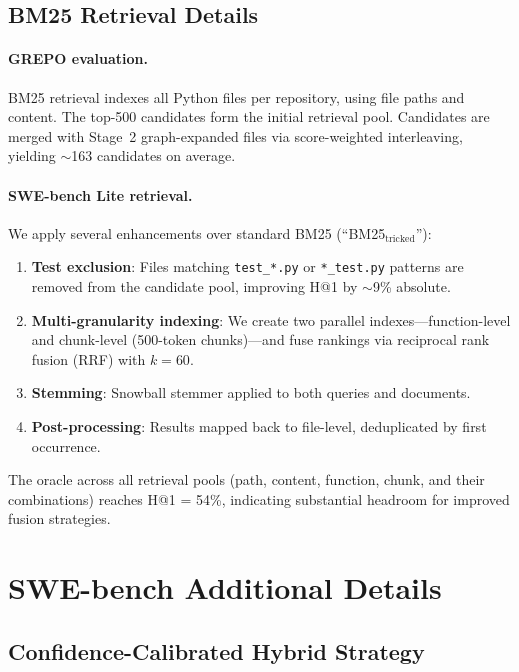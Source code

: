 \documentclass{article}
\begin{document}
\subsection{BM25 Retrieval Details}
\label{app:bm25}

\paragraph{GREPO evaluation.}
BM25 retrieval indexes all Python files per repository, using file paths and content.
The top-500 candidates form the initial retrieval pool.
Candidates are merged with Stage~2 graph-expanded files via score-weighted interleaving, yielding $\sim$163 candidates on average.

\paragraph{SWE-bench Lite retrieval.}
We apply several enhancements over standard BM25 (``BM25$_\text{tricked}$''):
\begin{enumerate}
    \item \textbf{Test exclusion}: Files matching \texttt{test\_*.py} or \texttt{*\_test.py} patterns are removed from the candidate pool, improving H@1 by $\sim$9\% absolute.
    \item \textbf{Multi-granularity indexing}: We create two parallel indexes---function-level and chunk-level (500-token chunks)---and fuse rankings via reciprocal rank fusion (RRF) with $k = 60$.
    \item \textbf{Stemming}: Snowball stemmer applied to both queries and documents.
    \item \textbf{Post-processing}: Results mapped back to file-level, deduplicated by first occurrence.
\end{enumerate}

The oracle across all retrieval pools (path, content, function, chunk, and their combinations) reaches H@1 = 54\%, indicating substantial headroom for improved fusion strategies.


\section{SWE-bench Additional Details}
\label{app:swebench_details}

\subsection{Confidence-Calibrated Hybrid Strategy}
\label{app:hybrid}
\end{document}
